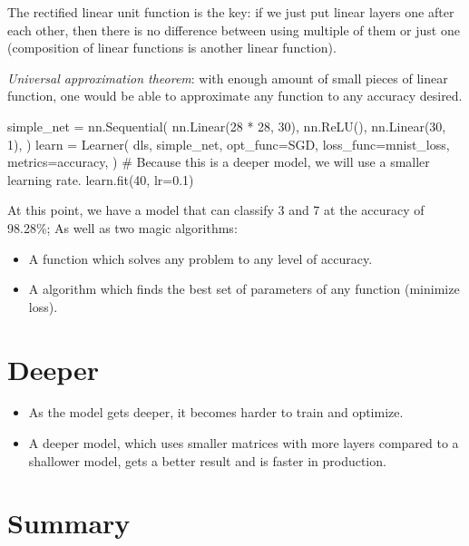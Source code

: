 \documentclass{article}
\newenvironment{monos}{\VerbatimEnvironment\begin{pythoncode}}{\end{pythoncode}}
\begin{document}
The rectified linear unit function is the key: if we just put linear layers one after
each other, then there is no difference between using multiple of them or just one
(composition of linear functions is another linear function).

\textit{Universal approximation theorem}: with enough amount of small pieces of linear
function, one would be able to approximate any function to any accuracy desired.

\begin{monos}
simple_net = nn.Sequential(
    nn.Linear(28 * 28, 30),
    nn.ReLU(),
    nn.Linear(30, 1),
)
learn = Learner(
    dls,
    simple_net,
    opt_func=SGD,
    loss_func=mnist_loss,
    metrics=accuracy,
)
# Because this is a deeper model, we will use a smaller learning rate.
learn.fit(40, lr=0.1)
\end{monos}

At this point, we have a model that can classify 3 and 7 at the accuracy of 98.28\%; As
well as two magic algorithms:

\begin{itemize}
    \item A function which solves any problem to any level of accuracy.
    \item A algorithm which finds the best set of parameters of any function (minimize
          loss).
\end{itemize}

\section{Deeper}

\begin{itemize}
    \item As the model gets deeper, it becomes harder to train and optimize.
    \item A deeper model, which uses smaller matrices with more layers compared to a
          shallower model, gets a better result and is faster in production.
\end{itemize}

\section{Summary}
\end{document}
